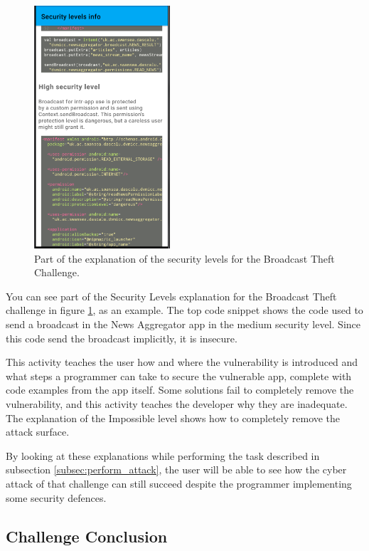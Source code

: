     \begin{figure}
        \centering
        \includegraphics[width=0.45\textwidth]{graphics/security_level_explanation.PNG}
        \caption{Part of the explanation of the security levels for the Broadcast Theft Challenge.}
        \label{fig:security_levels}
    \end{figure}
        
    You can see part of the Security Levels explanation for the Broadcast Theft challenge in figure \ref{fig:security_levels}, as an example. The top code snippet shows the code used to send a broadcast in the News Aggregator app in the medium security level. Since this code send the broadcast implicitly, it is insecure.
    
    This activity teaches the user how and where the vulnerability is introduced and what steps a programmer can take to secure the vulnerable app, complete with code examples from the app itself. Some solutions fail to completely remove the vulnerability, and this activity teaches the developer why they are inadequate. The explanation of the Impossible level shows how to completely remove the attack surface.
    
    By looking at these explanations while performing the task described in subsection \ref{subsec:perform_attack}, the user will be able to see how the cyber attack of that challenge can still succeed despite the programmer implementing some security defences.
    
    \subsection{Challenge Conclusion}
        \label{subsec:challenge_conclusion}
    
